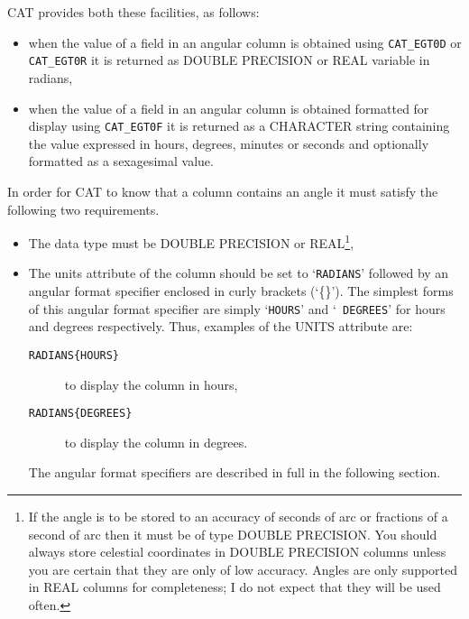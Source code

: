 CAT provides both these facilities, as follows:

\begin{itemize}

  \item when the value of a field in an angular column is
   obtained using {\tt CAT\_EGT0D} or {\tt CAT\_EGT0R} it is
   returned as DOUBLE PRECISION or REAL variable in radians,

  \item when the value of a field in an angular column is
   obtained formatted for display using {\tt CAT\_EGT0F} it is
   returned as a CHARACTER string containing the value expressed in
   hours, degrees, minutes or seconds and optionally formatted as a
   sexagesimal value.

\end{itemize}

In order for CAT to know that a column contains an angle it must
satisfy the following two requirements.

\begin{itemize}

  \item The data type must be DOUBLE PRECISION or
   REAL\footnote{If the angle is to be stored to an accuracy of
   seconds of arc or fractions of a second of arc then it must be
   of type DOUBLE PRECISION. You should always store celestial
   coordinates in DOUBLE PRECISION columns unless you are certain
   that they are only of low accuracy. Angles are only supported in
   REAL columns for completeness; I do not expect that they will be
   used often.},

  \item The units attribute of the column should be set to
   `{\tt RADIANS}' followed by an angular format specifier
   enclosed in curly brackets (`\{\}'). The simplest forms of this
   angular format specifier are simply `{\tt HOURS}' and `{\tt
   DEGREES}' for hours and degrees respectively. Thus, examples of
   the UNITS attribute are:

  \begin{description}

    \item[{\tt RADIANS\{HOURS\}}] to display the column in hours,

    \item[{\tt RADIANS\{DEGREES\}}] to display the column in degrees.

  \end{description}

   The angular format specifiers are described in full in the following
   section.

\end{itemize}

